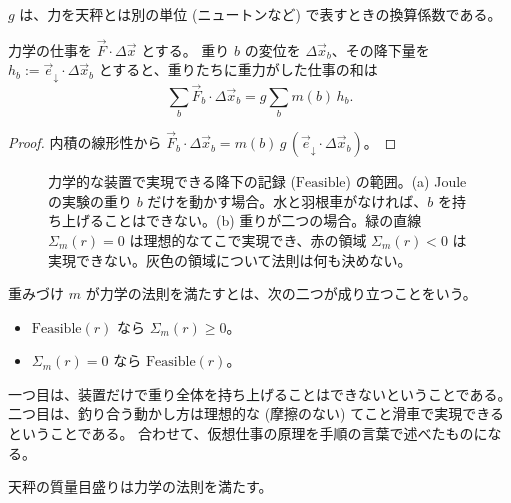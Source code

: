 $g$ は、力を天秤とは別の単位 (ニュートンなど) で表すときの換算係数である。

\begin{theorem}[力学の仕事との一致]
  \label{thm:gravity-work}
  \leanok
  力学の仕事を $\vec F \cdot \Delta \vec x$ とする。
  重り $b$ の変位を $\Delta \vec x_b$、その降下量を $h_b := \vec e_{\downarrow} \cdot \Delta \vec x_b$ とすると、重りたちに重力がした仕事の和は
  \[ \sum_b \vec F_b \cdot \Delta \vec x_b = g \sum_b m(b)\, h_b. \]
\end{theorem}

\begin{proof}
  \leanok
  内積の線形性から $\vec F_b \cdot \Delta \vec x_b = m(b)\, g\, (\vec e_{\downarrow} \cdot \Delta \vec x_b)$。
\end{proof}

\begin{figure}[htbp]
  \centering
  \caption{力学的な装置で実現できる降下の記録 ($\mathrm{Feasible}$) の範囲。(a) Joule の実験の重り $b$ だけを動かす場合。水と羽根車がなければ、$b$ を持ち上げることはできない。(b) 重りが二つの場合。緑の直線 $\Sigma_m(r) = 0$ は理想的なてこで実現でき、赤の領域 $\Sigma_m(r) < 0$ は実現できない。灰色の領域について法則は何も決めない。}
  \label{fig:feasible}
\end{figure}

\begin{definition}[力学の法則]
  \label{def:mechanical-law}
  \leanok
  重みづけ $m$ が力学の法則を満たすとは、次の二つが成り立つことをいう。
  \begin{itemize}
    \item $\mathrm{Feasible}(r)$ なら $\Sigma_m(r) \ge 0$。
    \item $\Sigma_m(r) = 0$ なら $\mathrm{Feasible}(r)$。
  \end{itemize}
\end{definition}

一つ目は、装置だけで重り全体を持ち上げることはできないということである。
二つ目は、釣り合う動かし方は理想的な (摩擦のない) てこと滑車で実現できるということである。
合わせて、仮想仕事の原理を手順の言葉で述べたものになる。

\begin{empirical}[天秤の質量は力学の法則を満たす]
  \label{emp:balance-law}
  \leanok
  天秤の質量目盛りは力学の法則を満たす。
\end{empirical}

